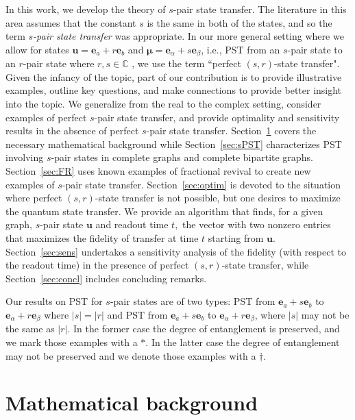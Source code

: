 \documentclass{article}
\numberwithin{equation}{section}
\newcommand{\be}{\mathbf e}
\newcommand{\bu}{\mathbf u}
\newcommand{\bmu}{{\boldsymbol{\mu}}}
\begin{document}
{In this work, we develop the theory of $s$-pair state transfer. The literature in this area assumes that the constant $s$ is the same in both of the states, and so the term \emph{$s$-pair state transfer} was appropriate. In our more general setting where we allow for states $\bu=\be_a+r \be_b$ and $\bmu = \be_{\alpha} + s \be_{\beta}$, i.e., PST from an $s$-pair state to an $r$-pair state where $r, s\in \mathbb C$ , we use the term ``perfect $(s,r)$-state transfer".
Given the infancy of the topic, part of our contribution is to provide illustrative examples, outline key questions,  and make connections to provide better insight into the topic. We generalize from the real to the  complex setting,  consider examples of perfect $s$-pair state transfer, and provide optimality and sensitivity results in the absence of perfect $s$-pair state transfer. 
Section~\ref{sec:back} covers the necessary mathematical background while Section~\ref{sec:sPST} characterizes PST involving $s$-pair states in complete graphs and complete bipartite graphs. Section~\ref{sec:FR} uses known examples of fractional revival to create new examples of $s$-pair state transfer. Section~\ref{sec:optim} is devoted to the situation where perfect $(s,r)$-state transfer is not possible, but one desires to maximize the quantum state transfer. We provide an algorithm that finds, for a given graph, $s$-pair state $\bu$ and readout time $t,$ the vector with two nonzero entries that maximizes the fidelity of transfer at time $t$ starting from $\bu.$ Section~\ref{sec:sens} undertakes a sensitivity analysis of the fidelity (with respect to the readout time) in the presence of perfect $(s,r)$-state transfer, while Section~\ref{sec:concl} includes concluding remarks. 

Our results on PST for $s$-pair states are of two types: PST from $\be_a + s\be_b$ to
 $\be_\alpha + r\be_\beta$ where $|s|=|r|$ and PST from $\be_a + s\be_b$ to
 $\be_\alpha + r\be_\beta$, where $|s|$ may not be the same as $|r|.$ In the former case the degree of entanglement is preserved, and we mark those examples with a $*$. In the latter case the degree of entanglement may not be preserved and we denote  those examples with a $\dagger$. 

\section{Mathematical background}\label{sec:back}

}
\end{document}
